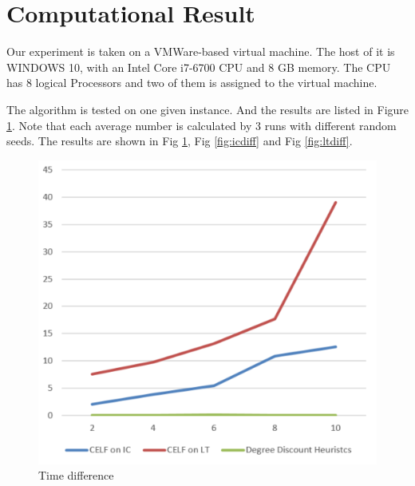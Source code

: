 \documentclass[journal,twoside,web]{ieeecolor}
\begin{document}
\section{Computational Result}
Our experiment is taken on a VMWare-based virtual machine. The host of it is WINDOWS 10, with an Intel Core i7-6700 CPU and 8 GB memory. The CPU has 8 logical Processors and two of them is assigned to the virtual machine.\par
The algorithm is tested on one given instance. And the results are listed in Figure \ref{fig:result}. Note that each average number is calculated by 3 runs with different random seeds. The results are shown in Fig \ref{fig:result}, Fig \ref{fig:icdiff} and Fig \ref{fig:ltdiff}.
\begin{figure}[!t]
\centerline{\includegraphics[width=\columnwidth]{result-time.png}}
\caption{Time difference}
\label{fig:result}
\end{figure}
\end{document}
